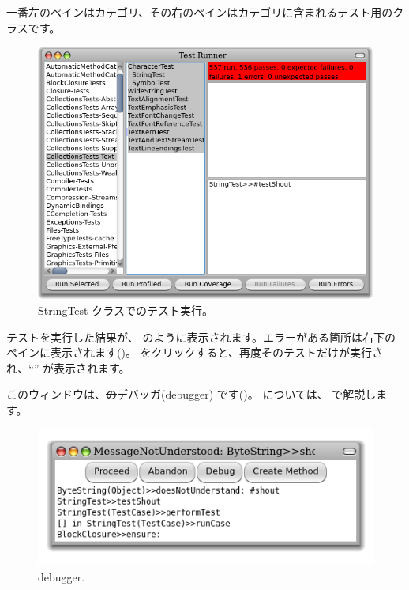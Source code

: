 \documentclass[a4paper,10pt,twoside]{book}
\begin{document}
一番左のペインはカテゴリ、その右のペインはカテゴリに含まれるテスト用のクラスです。


\begin{figure}[hbt]
\centerline {\includegraphics[width=\textwidth]{testRunnerOnStringTest}}
\caption{StringTest クラスでのテスト実行。
}
\end{figure}

テストを実行した結果が、 のように表示されます。エラーがある箇所は右下のペインに表示されます()。
 をクリックすると、再度そのテストだけが実行され、``'' が表示されます。

このウィンドウは、\st のデバッガ(debugger) です()。
 については、 で解説します。

\begin{figure}[hbt]
\centerline {\includegraphics[width=\textwidth]{Predebugger}}
\caption{debugger.}
\end{figure}
\end{document}
